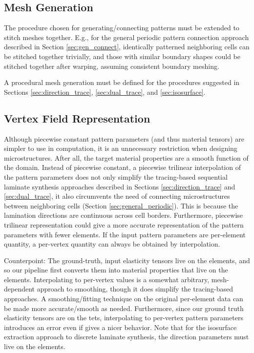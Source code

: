 \documentclass[10pt]{article}
\begin{document}
\subsection{Mesh Generation}
The procedure chosen for generating/connecting patterns must be
extended to stitch meshes together. E.g., for the general periodic pattern
connection approach described in Section \ref{sec:gen_connect}, identically
patterned neighboring cells can be stitched together trivially, and those with
similar boundary shapes could be stitched together after warping, assuming
consistent boundary meshing.

A procedural mesh generation must be defined for the procedures suggested
in Sections \ref{sec:direction_trace}, \ref{sec:dual_trace}, and
\ref{sec:isosurface}.

\subsection{Vertex Field Representation}
Although piecewise constant pattern parameters (and thus material tensors) are
simpler to use in computation, it is an unnecessary restriction when designing
microstructures.  After all, the target material properties are a smooth function
of the domain. Instead of piecewise constant, a piecewise trilinear
interpolation of the pattern parameters does not only simplify the tracing-based
sequential laminate synthesis approaches described in Sections
\ref{sec:direction_trace} and \ref{sec:dual_trace}, it also circumvents the need
of connecting microstructures between neighboring cells (Section
\ref{sec:general_periodic}).  This is because the lamination directions are
continuous across cell borders.  Furthermore, piecewise trilinear representation
could give a more accurate representation of the pattern parameters with fewer
elements. If the input pattern parameters are per-element quantity, a
per-vertex quantity can always be obtained by interpolation.

Counterpoint:
The ground-truth, input elasticity tensors live on the elements, and so our
pipeline first converts them into material properties that live on the elements.
Interpolating to per-vertex values is a somewhat arbitrary, mesh-dependent
approach to smoothing, though it does simplify the tracing-based
approaches. A smoothing/fitting technique on the original per-element data can
be made more accurate/smooth as needed. Furthermore, since our ground truth
elasticity tensors are on the tets, interpolating to per-vertex pattern
parameters introduces an error even if gives a nicer behavior. Note that for the
isosurface extraction approach to discrete laminate synthesis, the direction
parameters must live on the elements.
\end{document}
